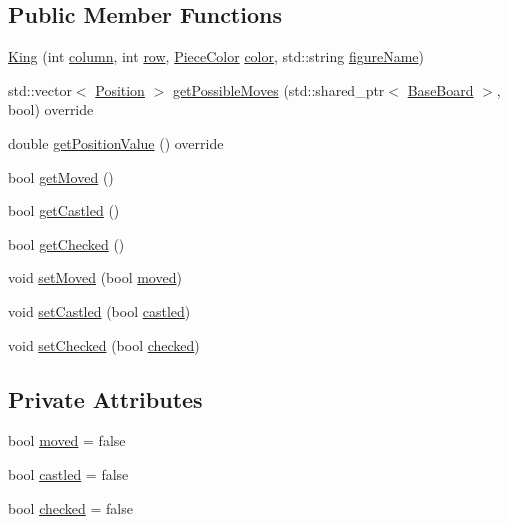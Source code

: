 \subsection*{Public Member Functions}
\begin{DoxyCompactItemize}
\item 
\hyperlink{class_king_aed2be62051387868f78919da2d1970c9}{King} (int \hyperlink{class_piece_aa8f39e11280395103164f6ae07398c82}{column}, int \hyperlink{class_piece_ac6ef7c474f20562cb629c2452ce0631d}{row}, \hyperlink{_piece_8h_ad7595c48bb74c0dd2a7648712a2d4985}{Piece\+Color} \hyperlink{class_piece_a8dfe0501fe95a1a7618cf5ad3b9fda69}{color}, std\+::string \hyperlink{class_piece_af2fe809fd0d35d167f2419768e49fd3a}{figure\+Name})
\item 
std\+::vector$<$ \hyperlink{struct_position}{Position} $>$ \hyperlink{class_king_ac320306876c17161cba6db2f4255751a}{get\+Possible\+Moves} (std\+::shared\+\_\+ptr$<$ \hyperlink{class_base_board}{Base\+Board} $>$, bool) override
\item 
double \hyperlink{class_king_a047413f5f6df784b2fd308f20e356ea4}{get\+Position\+Value} () override
\item 
bool \hyperlink{class_king_af1a2ad00bec8f420581666d1f3d4966d}{get\+Moved} ()
\item 
bool \hyperlink{class_king_a7f58cb2d7d005f03d229af195136b00a}{get\+Castled} ()
\item 
bool \hyperlink{class_king_aecc7387c9b2d6e94b556d416b985b210}{get\+Checked} ()
\item 
void \hyperlink{class_king_a989b5fc467d9b3f16394e4acd3767108}{set\+Moved} (bool \hyperlink{class_king_a1dd01a0341b4e3f10f55d520e52e4c8f}{moved})
\item 
void \hyperlink{class_king_a144a81bb4358863415ff41ff851fdbd4}{set\+Castled} (bool \hyperlink{class_king_af1d6712d05b377b1989d7625e5aceb38}{castled})
\item 
void \hyperlink{class_king_af55ffa8c550debf65d6b64a91472626b}{set\+Checked} (bool \hyperlink{class_king_afd51388c6257f775868f8bde25591a31}{checked})
\end{DoxyCompactItemize}
\subsection*{Private Attributes}
\begin{DoxyCompactItemize}
\item 
bool \hyperlink{class_king_a1dd01a0341b4e3f10f55d520e52e4c8f}{moved} = false
\item 
bool \hyperlink{class_king_af1d6712d05b377b1989d7625e5aceb38}{castled} = false
\item 
bool \hyperlink{class_king_afd51388c6257f775868f8bde25591a31}{checked} = false
\end{DoxyCompactItemize}


